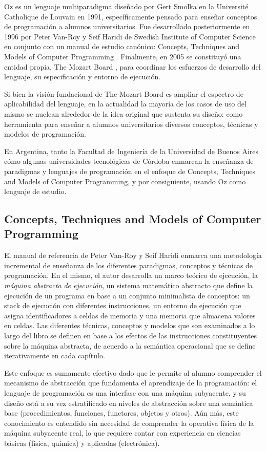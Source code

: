 \documentclass[a4paper,11pt]{article}
\begin{document}
Oz \cite{oz} es un lenguaje multiparadigma diseñado por Gert Smolka en la
Université Catholique de Louvain en 1991, específicamente pensado para enseñar
conceptos de programación a alumnos universitarios. Fue desarrollado
posteriormente en 1996 por Peter Van-Roy y Seif Haridi de Swedish Institute of
Computer Science en conjunto con un manual de estudio canónico: Concepts,
Techniques and Models of Computer Programming \cite{ctmcp}. Finalmente, en 2005
se constituyó una entidad propia, The Mozart Board \cite{mozboard}, para
coordinar los esfuerzos de desarrollo del lenguaje, su especificación y entorno
de ejecución.

Si bien la visión fundacional de The Mozart Board es ampliar el espectro de
aplicabilidad del lenguaje, en la actualidad la mayoría de los casos de uso del
mismo se nuclean alrededor de la idea original que sustenta su diseño: como
herramienta para enseñar a alumnos universitarios diversos conceptos, técnicas
y modelos de programación.

En Argentina, tanto la Facultad de Ingeniería de la Universidad de Buenos Aires
cómo algunas universidades tecnológicas de Córdoba enmarcan la enseñanza de
paradigmas y lenguajes de programación en el enfoque de Concepts, Techniques
and Models of Computer Programming, y por consiguiente, usando Oz como lenguaje
de estudio.

\subsection{Concepts, Techniques and Models of Computer Programming}

El manual de referencia de Peter Van-Roy y Seif Haridi \cite{ctmcp} enmarca una
metodología incremental de enseñanza de los diferentes paradigmas, conceptos y
técnicas de programación.  En el mismo, el autor desarrolla un marco teórico de
ejecución, la \emph{máquina abstracta de ejecución}, un sistema matemático
abstracto que define la ejecución de un programa en base a un conjunto
minimalista de conceptos: un stack de ejecución con diferentes instrucciones,
un entorno de ejecución que asigna identificadores a celdas de memoria y una
memoria que almacena valores en celdas. Las diferentes técnicas, conceptos y
modelos que son examinados a lo largo del libro se definen en base a los
efectos de las instrucciones constituyentes sobre la máquina abstracta, de
acuerdo a la semántica operacional que se define iterativamente en cada
capítulo.

Este enfoque es sumamente efectivo dado que le permite al alumno comprender el
mecanismo de abstracción que fundamenta el aprendizaje de la programación: el
lenguaje de programación es una interfase con una máquina subyacente, y su
diseño está a su vez estratificado en niveles de abstracción sobre una
semántica base (procedimientos, funciones, functores, objetos y otros). Aún
más, este conocimiento es entendido sin necesidad de comprender la operativa
física de la máquina subyacente real, lo que requiere contar con experiencia en
ciencias básicas (física, química) y aplicadas (electrónica).
\end{document}
